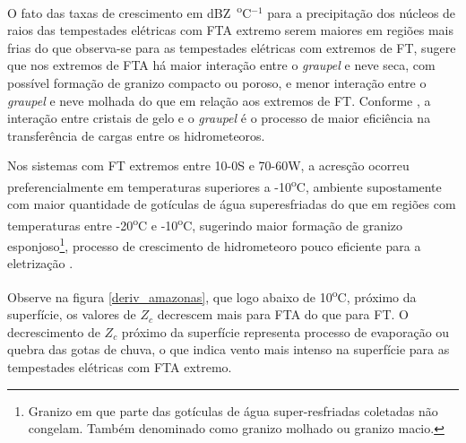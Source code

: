 O fato das taxas de crescimento em dBZ~\textsuperscript{o}C$^{-1}$ para a precipitação dos núcleos de raios das tempestades elétricas com FTA extremo serem maiores  em regiões mais frias do que observa-se para as tempestades elétricas com extremos de FT, sugere que nos extremos de FTA há maior interação entre o \textit{graupel} e neve seca, com possível formação de granizo compacto ou poroso, e menor interação entre o \textit{graupel} e neve molhada do que em relação aos extremos de FT. Conforme \cite{Takahashi1978}, a interação entre cristais de gelo e o \textit{graupel} é o processo de maior eficiência na transferência de cargas entre os hidrometeoros. 

Nos sistemas com FT extremos entre 10-0S e 70-60W, a acresção ocorreu preferencialmente em temperaturas superiores a -10\textsuperscript{o}C, ambiente supostamente com maior quantidade de gotículas de água superesfriadas do que em regiões com temperaturas entre -20\textsuperscript{o}C e -10\textsuperscript{o}C, sugerindo maior formação de granizo esponjoso\footnote{Granizo em que parte das gotículas de água super-resfriadas coletadas não congelam. Também denominado como granizo molhado ou granizo macio.}, processo de crescimento de hidrometeoro pouco eficiente para a eletrização \cite{jayaratne1983}. 



Observe na figura \ref{deriv_amazonas}, que logo abaixo de 10\textsuperscript{o}C, próximo da superfície, os valores de $Z_c$ decrescem mais para FTA do que para FT. O decrescimento de $Z_c$ próximo da superfície representa processo de evaporação ou quebra das gotas de chuva, o que indica vento mais intenso na superfície para as tempestades elétricas com FTA extremo. 



